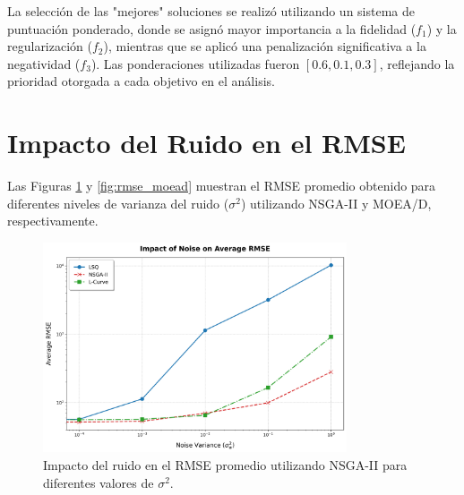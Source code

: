 La selección de las "mejores" soluciones se realizó utilizando un sistema de puntuación ponderado, donde se asignó mayor importancia a la fidelidad (\( f_1 \)) y la regularización (\( f_2 \)), mientras que se aplicó una penalización significativa a la negatividad (\( f_3 \)). Las ponderaciones utilizadas fueron \([0.6, 0.1, 0.3]\), reflejando la prioridad otorgada a cada objetivo en el análisis.




\section{Impacto del Ruido en el RMSE} \label{sec:results:noise}

Las Figuras \ref{fig:rmse_nsga2} y \ref{fig:rmse_moead} muestran el RMSE promedio obtenido para diferentes niveles de varianza del ruido (\( \sigma^2 \)) utilizando NSGA-II y MOEA/D, respectivamente.

\begin{figure}[H]
    \centering
    \includegraphics[width=0.8\textwidth]{Images/impact_noise_on_rmse_nsga2.png}
    \caption{Impacto del ruido en el RMSE promedio utilizando NSGA-II para diferentes valores de \( \sigma^2 \).}
    \label{fig:rmse_nsga2}
\end{figure}

